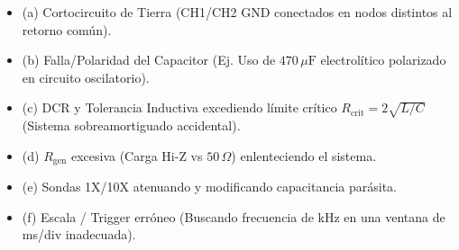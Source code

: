 \documentclass[11pt, a4paper, landscape]{article}
\begin{document}
\vspace{0.4cm}
\begin{tcolorbox}[colback=white, colframe=black, title=\textbf{Checklist Rápido de Causalidad RLC (Para rellenar columna Problema)}]
\begin{itemize}
    \item (a) Cortocircuito de Tierra (CH1/CH2 GND conectados en nodos distintos al retorno común).
    \item (b) Falla/Polaridad del Capacitor (Ej. Uso de $470\,\mu\text{F}$ electrolítico polarizado en circuito oscilatorio).
    \item (c) DCR y Tolerancia Inductiva excediendo límite crítico $R_{\text{crit}} = 2\sqrt{L/C}$ (Sistema sobreamortiguado accidental).
    \item (d) $R_{\text{gen}}$ excesiva (Carga Hi-Z vs $50\,\Omega$) enlenteciendo el sistema.
    \item (e) Sondas 1X/10X atenuando y modificando capacitancia parásita.
    \item (f) Escala / Trigger erróneo (Buscando frecuencia de kHz en una ventana de ms/div inadecuada).
\end{itemize}
\end{tcolorbox}
\end{document}
